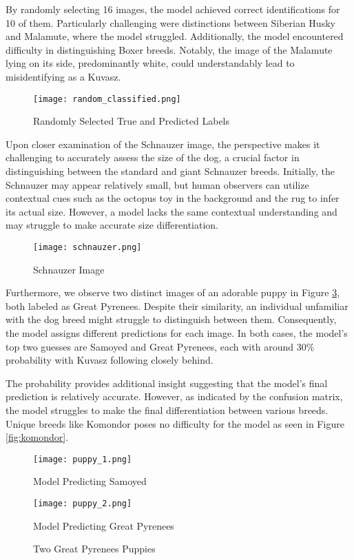 \documentclass[11pt]{article}
\begin{document}
By randomly selecting 16 images, the model achieved correct identifications for 10 of them. Particularly challenging were distinctions between Siberian Husky and Malamute, where the model struggled. Additionally, the model encountered difficulty in distinguishing Boxer breeds. Notably, the image of the Malamute lying on its side, predominantly white, could understandably lead to misidentifying as a Kuvasz. 


\begin{figure}[h]
    \centering
    \texttt{[image: random\_classified.png]}
    \caption{\label{fig:rnd_class}Randomly Selected True and Predicted Labels}
\end{figure}
\clearpage

Upon closer examination of the Schnauzer image, the perspective makes it challenging to accurately assess the size of the dog, a crucial factor in distinguishing between the standard and giant Schnauzer breeds. Initially, the Schnauzer may appear relatively small, but human observers can utilize contextual cues such as the octopus toy in the background and the rug to infer its actual size. However, a model lacks the same contextual understanding and may struggle to make accurate size differentiation.

\begin{figure}[h]
    \centering
    \texttt{[image: schnauzer.png]}
    \caption{\label{fig:schnauzer}Schnauzer Image}
\end{figure}

Furthermore, we observe two distinct images of an adorable puppy in Figure \ref{fig:puppies}, both labeled as Great Pyrenees. Despite their similarity, an individual unfamiliar with  the dog breed might struggle to distinguish between them. Consequently, the model assigns different predictions for each image. In both cases, the model's top two guesses are Samoyed and Great Pyrenees, each with around 30\% probability with Kuvasz following closely behind. 

The probability provides additional insight suggesting that the model's final prediction is relatively accurate. However, as indicated by the confusion matrix, the model struggles to make the final differentiation between various breeds. Unique breeds like Komondor poses no difficulty for the model as seen in Figure \ref{fig:komondor}.

\begin{figure}[h]
    \centering
    \begin{minipage}{0.45\textwidth}
        \centering
        \texttt{[image: puppy\_1.png]} %
        \caption{Model Predicting Samoyed}
    \end{minipage}\hfill
    \begin{minipage}{0.45\textwidth}
        \centering
        \texttt{[image: puppy\_2.png]} %
        \caption{Model Predicting Great Pyrenees}
    \end{minipage}
    \caption{\label{fig:puppies}Two Great Pyrenees Puppies}
\end{figure}
\end{document}
